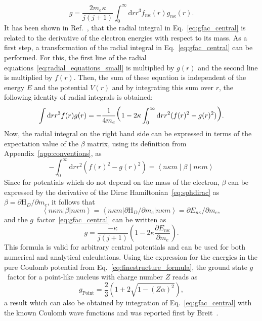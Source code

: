 \begin{equation}
g=\frac{2m_e\kappa}{j(j+1)}\int_0^\infty\mathrm{d}r r^3 f_{n\kappa}(r)g_{n\kappa}(r).
\label{eq:gfac_central}
\end{equation}
It has been shown in Ref.~\cite{Karshenboim2005}, that the radial integral in Eq.~\eqref{eq:gfac_central} is related to the derivative of the electron energies with respect to its mass. As a first step, a transformation of the radial integral in Eq.~\eqref{eq:gfac_central} can be performed. For this, the first line of the radial equations~\eqref{eq:radial_equations_small} is multiplied by $g(r)$ and the second line is multiplied by $f(r)$. Then, the sum of these equation is independent of the energy $E$ and the potential $V(r)$ and by integrating this sum over $r$, the following identity of radial integrals is obtained:
\begin{equation}
\int\mathrm{d}r r^3 f(r)g(r) = -\frac{1}{4m_e}
\text{\huge(}1-2\kappa \int_0^\infty\mathrm{d}r r^2 (f(r)^2-g(r)^2)\text{\huge)}.
\end{equation}
Now, the radial integral on the right hand side can be expressed in terms of the expectation value of the $\beta$ matrix, using its definition from Appendix~\ref{app:conventions}, as
\begin{equation}
-\int_0^\infty\mathrm{d}r r^2 (f(r)^2-g(r)^2)=\left<n\kappa m\middle|\beta\middle|n\kappa m\right>
\end{equation}
Since for potentials which do not depend on the mass of the electron, $\beta$ can be expressed by the derivative of the Dirac Hamiltonian~\eqref{eq:sphdirac} as $\beta = \partial\text{H}_D/\partial m_e$, it follows that
\begin{equation}
\left<n\kappa m\right|\beta\left|n\kappa m\right> = \left<n\kappa m\right|\partial\text{H}_D/\partial m_e\left|n\kappa m\right> = \partial E_{n\kappa}/\partial m_e,
\end{equation}
and the $g$~factor~\eqref{eq:gfac_central} can be written as
\begin{equation}
g = \frac{-\kappa}{j(j+1)}\left( 1-2\kappa\frac{\partial E_{n\kappa}}{\partial m_e}\right).
\label{eq:gfac_viaDeriv}
\end{equation}
This formula is valid for arbitrary central potentials and can be used for both numerical and analytical calculations. Using the expression for the energies in the pure Coulomb potential from Eq.~\eqref{eq:finestructure_formula}, the ground state $g$~factor for a point-like nucleus with charge number $Z$ reads as
\begin{equation}
\label{eq:point_gfac}
g_{\text{Point}}=\frac{2}{3}\left( 1+2\sqrt{1-(Z\alpha)^2}\right),
\end{equation}
a result which can also be obtained by integration of Eq.~\eqref{eq:gfac_central} with the known Coulomb wave functions and was reported first by Breit~\cite{breit1928}.

